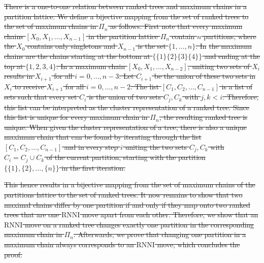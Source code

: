 \documentclass[11pt]{amsart}
\newcommand{\rnni}{\mathrm{RNNI}}
\providecommand{\DIFdeltex}[1]{{\protect\color{red}\sout{#1}}}                      %
\providecommand{\DIFdel}[1]{\texorpdfstring{\DIFdeltex{#1}}{}} %
\begin{document}
\DIFdel{There is a one-to-one relation between ranked trees and maximum chains in a partition lattice.
	We define a bijective mapping from the set of ranked trees to the set of maximum chains in $\Pi_n$ as follows.
	First note that every maximum chains $[X_0, X_1, \ldots, X_{n-1}]$ in the partition lattice $\Pi_n$ contain $n$ partitions, where the $X_0$ contains only singletons and $X_{n-1}$ is the set $\{1, \ldots, n\}$.
	In }%
\DIFdel{the maximum chains are the chains starting at the bottom at $\{\{1\}\{2\}\{3\}\{4\}\}$ and ending at the top at $\{1,2,3,4\}$.
	In a maximum chain $[X_0, X_1, \ldots, X_{n-2}]$, uniting two sets of $X_i$ results in $X_{i+1}$ for all $i = 0, \ldots, n-3$.
	Let $C_{i+1}$ be the union of these two sets in $X_i$ to receive $X_{i+1}$ for all $i = 0, \ldots, n-2$.
	The list $[C_1, C_2, \ldots, C_{n-1}]$ is a list of sets such that every set $C_i$ is the union of two sets $C_j, C_k$ with $j,k < i$.
	Therefore, this list can be interpreted as the cluster representation of a ranked tree.
	Since this list is unique for every maximum chain in $\Pi_n$, the resulting ranked tree is unique.
	When given the cluster representation of a tree, there is also a unique maximum chain that can be found by iterating through the list $[C_1, C_2, \ldots, C_{n-1}]$ and in every step $i$ uniting the two sets $C_j, C_k$ with $C_i = C_j \cup C_k$ of the current partition, starting with the partition $\{\{1\},\{2\}, \ldots, \{n\}\}$ in the first iteration.
}%

\DIFdel{This hence results in a bijective mapping from the set of maximum chains of the partitions lattice to the set of ranked trees.
	It now remains to show that two maximal chains differ by one partition if and only if they map onto two ranked trees that are one $\rnni$ move apart from each other.
	Therefore, we show that an $\rnni$ move on a ranked tree changes exactly one partition in the corresponding maximum chain in $\Pi_n$.
	Afterwards, we prove that changing one partition in a maximum chain always corresponds to an $\rnni$ move, which concludes the proof.
}%
\end{document}

